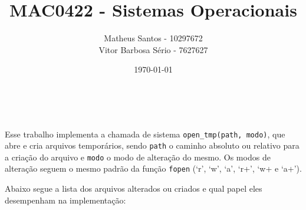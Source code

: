 \documentclass[12pt, a4paper]{article}
\title{MAC0422 - Sistemas Operacionais}
\author{Matheus Santos - 10297672 \\ Vitor Barbosa Sério - 7627627}
\date{\today}
\begin{document}
\makeatletter
\begin{flushright}
\@date
\end{flushright}
\begin{center}
{\Large \@title \\}
{\large \@author}
\end{center}
\makeatother

Esse trabalho implementa a chamada de sistema \texttt{open{\_}tmp(path, modo)}, que abre e cria arquivos temporários, sendo \texttt{path} o caminho absoluto ou relativo para a criação do arquivo e \texttt{modo} o modo de alteração do mesmo. Os modos de alteração seguem o mesmo padrão da função \texttt{fopen} (`r', `w', `a', `r+', `w+ e `a+').

Abaixo segue a lista dos arquivos alterados ou criados e qual papel eles desempenham na implementação:
\end{document}
